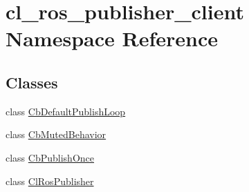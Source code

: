 \hypertarget{namespacecl__ros__publisher__client}{}\section{cl\+\_\+ros\+\_\+publisher\+\_\+client Namespace Reference}
\label{namespacecl__ros__publisher__client}
\subsection*{Classes}
\begin{DoxyCompactItemize}
\item 
class \hyperlink{classcl__ros__publisher__client_1_1CbDefaultPublishLoop}{Cb\+Default\+Publish\+Loop}
\item 
class \hyperlink{classcl__ros__publisher__client_1_1CbMutedBehavior}{Cb\+Muted\+Behavior}
\item 
class \hyperlink{classcl__ros__publisher__client_1_1CbPublishOnce}{Cb\+Publish\+Once}
\item 
class \hyperlink{classcl__ros__publisher__client_1_1ClRosPublisher}{Cl\+Ros\+Publisher}
\end{DoxyCompactItemize}
